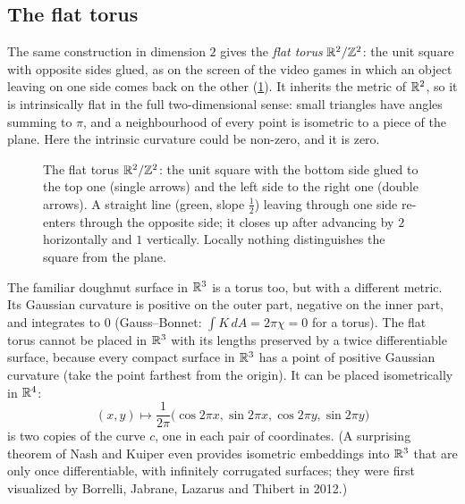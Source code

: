 \begin{notechapter}
\section{The flat torus}

The same construction in dimension $2$ gives the \emph{flat torus} $\mathbb{R}^2/\mathbb{Z}^2$: the unit square with
opposite sides glued, as on the screen of the video games in which an object leaving on one side
comes back on the other (\cref{flat-circle:fig:torus}). It inherits the metric of $\mathbb{R}^2$, so it is intrinsically flat in the full
two-dimensional sense: small triangles have angles summing to $\pi$, and a neighbourhood of every point
is isometric to a piece of the plane. Here the intrinsic curvature could be non-zero, and it is zero.

\begin{figure}[ht]
\centering
{}
\caption{The flat torus $\mathbb{R}^2/\mathbb{Z}^2$: the unit square with the bottom side glued to the top one (single
arrows) and the left side to the right one (double arrows). A straight line (green, slope $\frac12$) leaving
through one side re-enters through the opposite side; it closes up after advancing by $2$
horizontally and $1$ vertically. Locally nothing distinguishes the square from the plane.}
\label{flat-circle:fig:torus}
\end{figure}

The familiar doughnut surface in $\mathbb{R}^3$ is a torus too, but with a different metric. Its Gaussian
curvature is positive on the outer part, negative on the inner part, and integrates to $0$
(Gauss--Bonnet: $\int K\,dA = 2\pi\chi = 0$ for a torus). The flat torus cannot be placed in $\mathbb{R}^3$ with its
lengths preserved by a twice differentiable surface, because every compact surface in $\mathbb{R}^3$ has a
point of positive Gaussian curvature (take the point farthest from the origin). It can be placed
isometrically in $\mathbb{R}^4$:
\[
  (x, y)\mapsto\frac1{2\pi}\bigl(\cos2\pi x, \sin2\pi x, \cos2\pi y, \sin2\pi y\bigr)
\]
is two copies of the curve $c$, one in each pair of coordinates. (A surprising theorem of Nash and
Kuiper even provides isometric embeddings into $\mathbb{R}^3$ that are only once differentiable, with
infinitely corrugated surfaces; they were first visualized by Borrelli, Jabrane, Lazarus and
Thibert in 2012.)


\end{notechapter}
